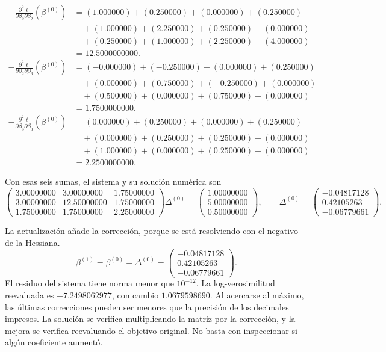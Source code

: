 \documentclass[11pt,a4paper]{article}
\begin{document}
\[
\begin{aligned}
-\frac{\partial^2\ell}{\partial\beta_2\partial\beta_2}(\beta^{(0)})&=(1.000000)+(0.250000)+(0.000000)+(0.250000)\\&\quad+(1.000000)+(2.250000)+(0.250000)+(0.000000)\\&\quad+(0.250000)+(1.000000)+(2.250000)+(4.000000)\\&=12.5000000000.\end{aligned}
\]
\[
\begin{aligned}
-\frac{\partial^2\ell}{\partial\beta_2\partial\beta_3}(\beta^{(0)})&=(-0.000000)+(-0.250000)+(0.000000)+(0.250000)\\&\quad+(0.000000)+(0.750000)+(-0.250000)+(0.000000)\\&\quad+(0.500000)+(0.000000)+(0.750000)+(0.000000)\\&=1.7500000000.\end{aligned}
\]
\[
\begin{aligned}
-\frac{\partial^2\ell}{\partial\beta_3\partial\beta_3}(\beta^{(0)})&=(0.000000)+(0.250000)+(0.000000)+(0.250000)\\&\quad+(0.000000)+(0.250000)+(0.250000)+(0.000000)\\&\quad+(1.000000)+(0.000000)+(0.250000)+(0.000000)\\&=2.2500000000.\end{aligned}
\]

Con esas seis sumas, el sistema y su solución numérica son
\[
\begin{pmatrix}3.00000000&3.00000000&1.75000000\\3.00000000&12.50000000&1.75000000\\1.75000000&1.75000000&2.25000000\end{pmatrix}\Delta^{(0)}=\begin{pmatrix}1.00000000\\5.00000000\\0.50000000\end{pmatrix},\qquad\Delta^{(0)}=\begin{pmatrix}-0.04817128\\0.42105263\\-0.06779661\end{pmatrix}.
\]

La actualización añade la corrección, porque se está resolviendo
con el negativo de la Hessiana.
\[
\beta^{(1)}=\beta^{(0)}+\Delta^{(0)}=\begin{pmatrix}-0.04817128\\0.42105263\\-0.06779661\end{pmatrix}.
\]
El residuo del sistema tiene norma menor que \(10^{-12}\). La log-verosimilitud reevaluada es \(-7.2498062977\), con cambio \(1.0679598690\). 
Al acercarse al máximo, las últimas correcciones pueden ser
menores que la precisión de los decimales impresos.
La solución se verifica multiplicando la matriz por la corrección,
y la mejora se verifica reevaluando el objetivo original.
No basta con inspeccionar si algún coeficiente aumentó.
\endgroup
\end{document}
